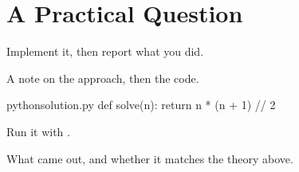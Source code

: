 \section{A Practical Question }

\begin{question}
    Implement it, then report what you did.
\end{question}

\begin{answer}[Implementation]
    A note on the approach, then the code.

    \begin{code}{python}{solution.py}
    def solve(n):
        return n * (n + 1) // 2
    \end{code}

    Run it with .
\end{answer}

\begin{answer}[Results]
    What came out, and whether it matches the theory above.

\end{answer}
